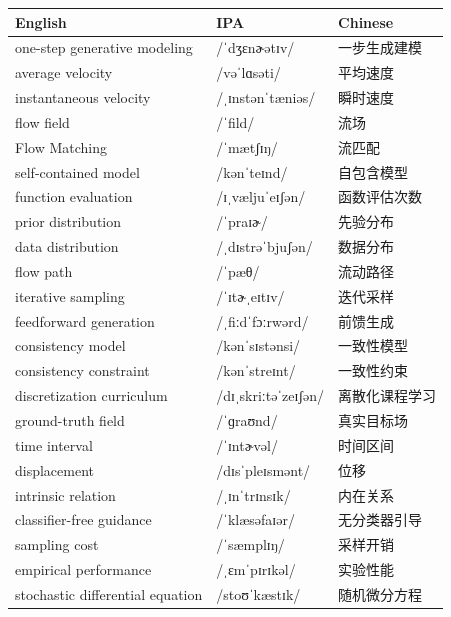 \documentclass[UTF8,12pt,a4paper]{ctexart}
\providecommand{\zh}[1]{#1}
\begin{document}
\begin{tabular*}{\textwidth}{@{\extracolsep{\fill}}lll@{}}
\toprule
\textbf{English} & \textbf{IPA} & \textbf{Chinese} \\
\midrule
one-step generative modeling & {\ipafont /ˈdʒɛnɚətɪv/} & \zh{一步生成建模} \\
average velocity & {\ipafont /vəˈlɑsəti/} & \zh{平均速度} \\
instantaneous velocity & {\ipafont /ˌɪnstənˈtæniəs/} & \zh{瞬时速度} \\
flow field & {\ipafont /ˈfild/} & \zh{流场} \\
Flow Matching & {\ipafont /ˈmætʃɪŋ/} & \zh{流匹配} \\
self-contained model & {\ipafont /kənˈteɪnd/} & \zh{自包含模型} \\
function evaluation & {\ipafont /ɪˌvæljuˈeɪʃən/} & \zh{函数评估次数} \\
prior distribution & {\ipafont /ˈpraɪɚ/} & \zh{先验分布} \\
data distribution & {\ipafont /ˌdɪstrəˈbjuʃən/} & \zh{数据分布} \\
flow path & {\ipafont /ˈpæθ/} & \zh{流动路径} \\
iterative sampling & {\ipafont /ˈɪtɚˌeɪtɪv/} & \zh{迭代采样} \\
feedforward generation & {\ipafont /ˌfiːdˈfɔːrwərd/} & \zh{前馈生成} \\
consistency model & {\ipafont /kənˈsɪstənsi/} & \zh{一致性模型} \\
consistency constraint & {\ipafont /kənˈstreɪnt/} & \zh{一致性约束} \\
discretization curriculum & {\ipafont /dɪˌskriːtəˈzeɪʃən/} & \zh{离散化课程学习} \\
ground-truth field & {\ipafont /ˈɡraʊnd/} & \zh{真实目标场} \\
time interval & {\ipafont /ˈɪntɚvəl/} & \zh{时间区间} \\
displacement & {\ipafont /dɪsˈpleɪsmənt/} & \zh{位移} \\
intrinsic relation & {\ipafont /ˌɪnˈtrɪnsɪk/} & \zh{内在关系} \\
classifier-free guidance & {\ipafont /ˈklæsəfaɪər/} & \zh{无分类器引导} \\
sampling cost & {\ipafont /ˈsæmplɪŋ/} & \zh{采样开销} \\
empirical performance & {\ipafont /ˌɛmˈpɪrɪkəl/} & \zh{实验性能} \\
stochastic differential equation & {\ipafont /stoʊˈkæstɪk/} & \zh{随机微分方程} \\

\end{tabular*}
\end{document}

